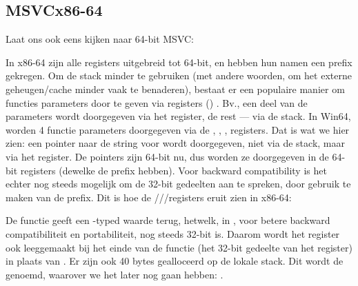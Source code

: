 \subsection{MSVC\EMDASH{}x86-64}

Laat ons ook eens kijken naar 64-bit MSVC:




In x86-64 zijn alle registers uitgebreid tot 64-bit, en hebben hun namen een  prefix gekregen.
Om de stack minder te gebruiken (met andere woorden, om het externe geheugen/cache minder vaak te benaderen), bestaat
er een populaire manier om functies parameters door te geven via registers () .
Bv., een deel van de parameters wordt doorgegeven via het register, de rest --- via de stack.
In Win64, worden 4 functie parameters doorgegeven via de \RCX, \RDX, ,  registers.
Dat is wat we hier zien: een pointer naar de string voor \printf wordt doorgegeven, niet via de stack, maar via het \RCX register.
De pointers zijn 64-bit nu, dus worden ze doorgegeven in de 64-bit registers (dewelke de  prefix hebben).
Voor backward compatibility is het echter nog steeds mogelijk om de 32-bit gedeelten aan te spreken, door gebruik te maken van de  prefix.
Dit is hoe de \RAX/\EAX/\AX/\AL registers eruit zien in x86-64:


De \main functie geeft een \Tint{}-typed waarde terug, hetwelk, in \CCpp, voor betere backward compatibiliteit
en portabiliteit, nog steeds 32-bit is. Daarom wordt het \EAX register ook leeggemaakt bij het einde van de functie
(het 32-bit gedeelte van het register) in plaats van \RAX{}.
Er zijn ook 40 bytes gealloceerd op de lokale stack.
Dit wordt de  genoemd, waarover we het later nog gaan hebben: .

